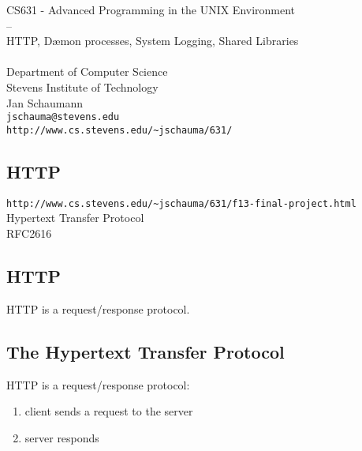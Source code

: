 \documentclass[xga]{xdvislides}
\begin{document}
\setfontphv

\lhead{\slidetitle}
\cfoot{\relax}
\rfoot{\Gray{\today}}

\vspace*{\fill}
\begin{center}
	\Hugesize
		CS631 - Advanced Programming in the UNIX Environment\\
		-- \\
		HTTP, D\ae mon processes, System Logging, Shared Libraries\\
	\hspace*{5mm}\blueline\\ [1em]
	\Normalsize
		Department of Computer Science\\
		Stevens Institute of Technology\\
		Jan Schaumann\\
		\verb+jschauma@stevens.edu+\\
		\verb+http://www.cs.stevens.edu/~jschauma/631/+
\end{center}
\vspace*{\fill}

\subsection{HTTP}
\vspace{.5in}
\begin{center}
	\verb+http://www.cs.stevens.edu/~jschauma/631/f13-final-project.html+ \\
	\vspace{.5in}
	\Huge
	Hypertext Transfer Protocol
	\\
	\vspace{.5in}
	RFC2616
\end{center}
\Normalsize

\subsection{HTTP}
\vspace{.5in}
\begin{center}
	\Huge
	HTTP is a request/response protocol.
\end{center}
\Normalsize

\subsection{The Hypertext Transfer Protocol}
HTTP is a request/response protocol:
\begin{enumerate}
	\item client sends a request to the server
	\item server responds
\end{enumerate}
\end{document}
